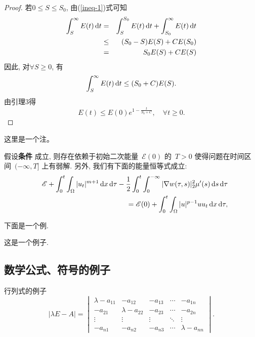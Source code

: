 \begin{proof}
若$0\leq S\leq S_0$, 由(\ref{ineq-1})式可知
\begin{eqnarray*}
  \int_S^{\infty} E(t)\mathop{}\!\mathrm{d} t &=& \int_S^{S_0} E(t)\mathop{}\!\mathrm{d} t +\int_{S_0}^{\infty} E(t)\mathop{}\!\mathrm{d} t\\
  &\leq &(S_0-S) E(S)+CE(S_0)\\
 &= &S_0 E(S) +CE(S)
\end{eqnarray*}
因此, 对$\forall S\geq 0$, 有
$$\int_S^{\infty} E(t) \mathop{}\!\mathrm{d} t \leq  (S_0+C)E(S).$$
由引理3得
$$E(t)\leq E(0)e^{1-\frac{t}{S_0+C}},\quad \forall t\geq 0.$$
\end{proof}
\begin{remark}
这里是一个注。
\end{remark}

\begin{theorem}  \label{Thm: local existence}
 假设\textbf{条件} 成立, 则存在依赖于初始二次能量~$\mathscr{E}(0)$ 的~$T>0$ 使得问题在时间区间~$(-\infty, T]$ 上有弱解. 另外, 我们有下面的能量恒等式成立:
\begin{eqnarray}
&&\mathscr{E}+\int_0^t\int_\Omega |u_t|^{m+1} \mathop{}\!\mathrm{d} x\mathop{}\!\mathrm{d} \tau-\frac12 \int_0^t\int_0^{-\infty}|\nabla w(\tau,s)|_2^2 \mu'(s)\mathop{}\!\mathrm{d} s\mathop{}\!\mathrm{d} \tau\nonumber\\
&&=\mathscr{E}(0)+\int_0^t\int_\Omega |u|^{p-1}uu_t\mathop{}\!\mathrm{d} x\mathop{}\!\mathrm{d}\tau,\label{4 quadratic energy identity}
\end{eqnarray}
\end{theorem}


下面是一个例.
\begin{example}
  这是一个例子.
\end{example}


\subsection{数学公式、符号的例子}

行列式的例子
\begin{equation*}
  |\lambda E- A|=
  \begin{vmatrix}
   \lambda-a_{11} & -a_{12} & -a_{13}&\cdots &-a_{1n} \\
    -a_{21} & \lambda-a_{22} & -a_{23} &\cdots & -a_{2n}\\
    \vdots & \vdots & \vdots&\ddots&\vdots \\
    -a_{n1} & -a_{n2} & -a_{n3} &\cdots& \lambda -a_{nn}
 \end{vmatrix}.
\end{equation*}

